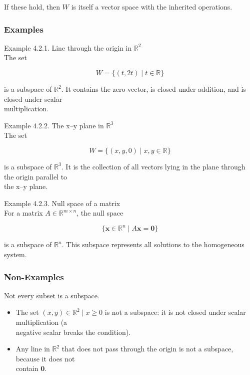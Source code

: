 \documentclass[
  12pt,
  a4paper,
]{article}
\begin{document}
If these hold, then \(W\) is itself a vector space with the inherited
operations.

\subsubsection{Examples}\label{examples-3}

Example 4.2.1. Line through the origin in \(\mathbb{R}^2\)\\
The set

\[W = \{ (t, 2t) \mid t \in \mathbb{R} \}\]

is a subspace of \(\mathbb{R}^2\). It contains the zero vector, is
closed under addition, and is closed under scalar\\
multiplication.

Example 4.2.2. The x--y plane in \(\mathbb{R}^3\)\\
The set

\[W = \{ (x, y, 0) \mid x,y \in \mathbb{R} \}\]

is a subspace of \(\mathbb{R}^3\). It is the collection of all vectors
lying in the plane through the origin parallel to\\
the x--y plane.

Example 4.2.3. Null space of a matrix\\
For a matrix \(A \in \mathbb{R}^{m \times n}\), the null space

\[\{ \mathbf{x} \in \mathbb{R}^n \mid A\mathbf{x} = \mathbf{0} \}\]

is a subspace of \(\mathbb{R}^n\). This subspace represents all
solutions to the homogeneous system.

\subsubsection{Non-Examples}\label{non-examples-2}

Not every subset is a subspace.

\begin{itemize}
\item
  The set \({ (x,y) \in \mathbb{R}^2 \mid x \geq 0 }\) is not a
  subspace: it is not closed under scalar multiplication (a\\
  negative scalar breaks the condition).
\item
  Any line in \(\mathbb{R}^2\) that does not pass through the origin is
  not a subspace, because it does not\\
  contain \(\mathbf{0}\).
\end{itemize}
\end{document}
